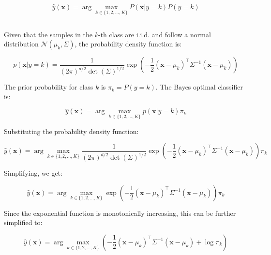 \documentclass[oneside,solution]{seu-ml-assign}
\begin{document}
\begin{equation}
  \hat{y}(\mathbf{x}) = \arg\max_{k \in \{1, 2, \ldots, K\}} P(\mathbf{x} | y = k) P(y = k)
\end{equation}


\subsection{}
Given that the samples in the \(k\)-th class are i.i.d. and follow a normal distribution \(\mathcal{N}(\mu_k, \Sigma)\), the probability density function is:

\begin{equation}
  p(\mathbf{x} | y = k) = \frac{1}{(2\pi)^{d/2} \det(\Sigma)^{1/2}} \exp\left( -\frac{1}{2} (\mathbf{x} - \mu_k)^\top \Sigma^{-1} (\mathbf{x} - \mu_k) \right)
\end{equation}

The prior probability for class \(k\) is \(\pi_k = P(y = k)\). The Bayes optimal classifier is:

\begin{equation}
  \hat{y}(\mathbf{x}) = \arg\max_{k \in \{1, 2, \ldots, K\}} p(\mathbf{x} | y = k) \pi_k
\end{equation}

Substituting the probability density function:

\begin{equation}
  \hat{y}(\mathbf{x}) = \arg\max_{k \in \{1, 2, \ldots, K\}} \frac{1}{(2\pi)^{d/2} \det(\Sigma)^{1/2}} \exp\left( -\frac{1}{2} (\mathbf{x} - \mu_k)^\top \Sigma^{-1} (\mathbf{x} - \mu_k) \right) \pi_k
\end{equation}

Simplifying, we get:

\begin{equation}
  \hat{y}(\mathbf{x}) = \arg\max_{k \in \{1, 2, \ldots, K\}} \exp\left( -\frac{1}{2} (\mathbf{x} - \mu_k)^\top \Sigma^{-1} (\mathbf{x} - \mu_k) \right) \pi_k
\end{equation}

Since the exponential function is monotonically increasing, this can be further simplified to:

\begin{equation}
  \hat{y}(\mathbf{x}) = \arg\max_{k \in \{1, 2, \ldots, K\}} \left( -\frac{1}{2} (\mathbf{x} - \mu_k)^\top \Sigma^{-1} (\mathbf{x} - \mu_k) + \log \pi_k \right)
\end{equation}
\end{document}
